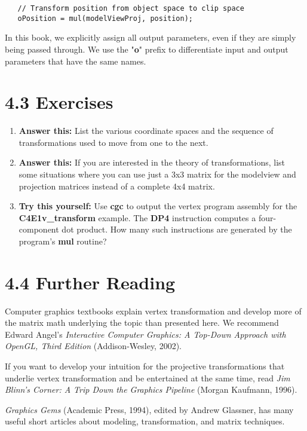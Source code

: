 \documentclass[../main.tex]{subfiles}
\begin{document}
\FloatBarrier
\begin{lstlisting}
   // Transform position from object space to clip space
   oPosition = mul(modelViewProj, position);
\end{lstlisting}
\FloatBarrier

In this book, we explicitly assign all output parameters, even if they are simply being passed through. We use the "\textbf{o}" prefix to differentiate input and output parameters that have the same names.

\section{4.3 Exercises}

\begin{enumerate}
\item \textbf{Answer this:} List the various coordinate spaces and the sequence of transformations used to move from one to the next.
\item \textbf{Answer this:} If you are interested in the theory of transformations, list some situations where you can use just a 3x3 matrix for the modelview and projection matrices instead of a complete 4x4 matrix.
\item \textbf{Try this yourself:} Use \textbf{cgc} to output the vertex program assembly for the \textbf{C4E1v_transform} example. The \textbf{DP4} instruction computes a four-component dot product. How many such instructions are generated by the program's \textbf{mul} routine?
\end{enumerate}

\section{4.4 Further Reading}

Computer graphics textbooks explain vertex transformation and develop more of the matrix math underlying the topic than presented here. We recommend Edward Angel's \textit{Interactive Computer Graphics: A Top-Down Approach with OpenGL, Third Edition} (Addison-Wesley, 2002).

If you want to develop your intuition for the projective transformations that underlie vertex transformation and be entertained at the same time, read \textit{Jim Blinn's Corner: A Trip Down the Graphics Pipeline} (Morgan Kaufmann, 1996).

\textit{Graphics Gems} (Academic Press, 1994), edited by Andrew Glassner, has many useful short articles about modeling, transformation, and matrix techniques.
\end{document}
